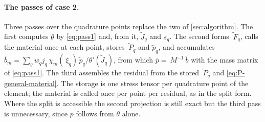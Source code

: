 \documentclass{article}
\newcommand{\F}{~F}
\renewcommand{\P}{~P}
\theoremstyle{definition}
\theoremstyle{plain}
\begin{document}
\paragraph{The passes of case 2.} Three passes over the quadrature points
replace the two of \cref{sec:algorithm}. The first computes $\bar\theta$
by \eqref{eq:pass1} and, from it, $\tilde J_q$ and $s_q$. The second forms
$\tilde{\F}_q$, calls the material once at each point, stores
$\tilde{\P}_q$ and $\tilde p_q$, and accumulates $\bar b_m = \sum_q w_q
j_q\, \chi_m(~\xi_q)\, \tilde p_q / \theta'(\tilde J_q)$, from which $\bar p
= ~M^{-1}\bar{~b}$ with the mass matrix of \eqref{eq:pass1}. The third
assembles the residual from the stored $\tilde{\P}_q$ and
\eqref{eq:P-general-material}. The storage is one stress tensor per
quadrature point of the element; the material is called once per point per
residual, as in the split form. Where the split is accessible the
second projection is still exact but the third pass is unnecessary, since
$\bar p$ follows from $\bar\theta$ alone.
\end{document}
